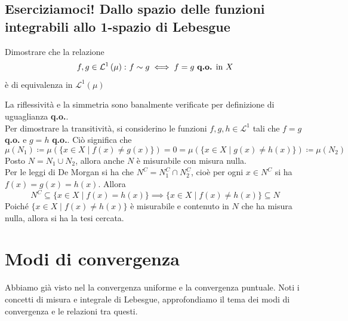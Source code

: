 \subsection{Eserciziamoci! Dallo spazio delle funzioni integrabili allo 1-spazio di Lebesgue}
\begin{exercise}
	Dimostrare che la relazione
	\begin{equation}
		f,g\in\mathcal{L}^{1}\left(\mu\right)\colon f\sim g\iff f=g\text{ \textbf{q.o.} in }X
	\end{equation}
	è di equivalenza in $\mathcal{L}^{1}\left(\mu\right)$
\end{exercise}
\begin{solution}
	La riflessività e la simmetria sono banalmente verificate per definizione di uguaglianza \textbf{q.o.}.\\
	Per dimostrare la transitività, si considerino le funzioni $f,g,h\in\mathcal{L}^{1}$ tali che $f=g$ \textbf{q.o.} e $g=h$ \textbf{q.o.}. Ciò significa che
	\begin{equation*}
		\mu(N_1)\coloneqq\mu\left(\{x\in X\mid f(x)\neq g(x)\}\right)=0=\mu\left(\{x\in X\mid g(x)\neq h(x)\}\right)\coloneqq\mu(N_2)
	\end{equation*}
	Posto $N=N_1\cup N_2$, allora anche $N$ è misurabile con misura nulla.\\
	Per le leggi di De Morgan si ha che $N^C=N_1^C\cap N_2^C$, cioè per ogni $x\in N^C$ si ha $f(x)=g(x)=h(x)$. Allora
	\begin{equation*}
		N^C\subseteq\{x\in X\mid f(x)=h(x)\}\implies \{x\in X\mid f(x)\neq h(x)\}\subseteq N
	\end{equation*}
	Poiché $\{x\in X\mid f(x)\neq h(x)\}$ è misurabile e contenuto in $N$ che ha misura nulla, allora si ha la tesi cercata.
\end{solution}
\section{Modi di convergenza}\label{modiconvergenza}
Abbiamo già visto nel  la convergenza uniforme e la convergenza puntuale. Noti i concetti di misura e integrale di Lebesgue, approfondiamo il tema dei modi di convergenza e le relazioni tra questi.
